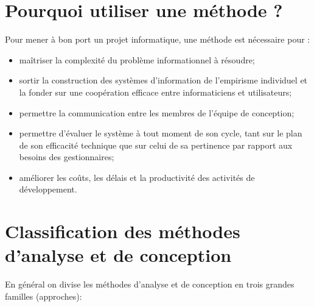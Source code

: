 \documentclass[a4paper, 12pt]{report}
\begin{document}
\section{Pourquoi utiliser  une méthode ?}
Pour mener à bon port un projet informatique, une méthode est nécessaire pour :

\begin{itemize}
  \item maîtriser la complexité du problème informationnel à résoudre;
  \item sortir la construction des systèmes d'information de l'empirisme individuel et la fonder sur une coopération efficace entre informaticiens et utilisateurs;
  \item permettre la communication entre les membres de l'équipe de conception;
  \item permettre d'évaluer le système à tout moment de son cycle, tant sur le plan de son efficacité technique que sur celui de sa pertinence par rapport aux besoins des gestionnaires;
  \item améliorer les coûts, les délais et la productivité des activités de développement.
\end{itemize}


\section{Classification des méthodes d'analyse et de conception}
En général on divise les méthodes d'analyse et de conception en trois grandes familles (approches):
\end{document}
